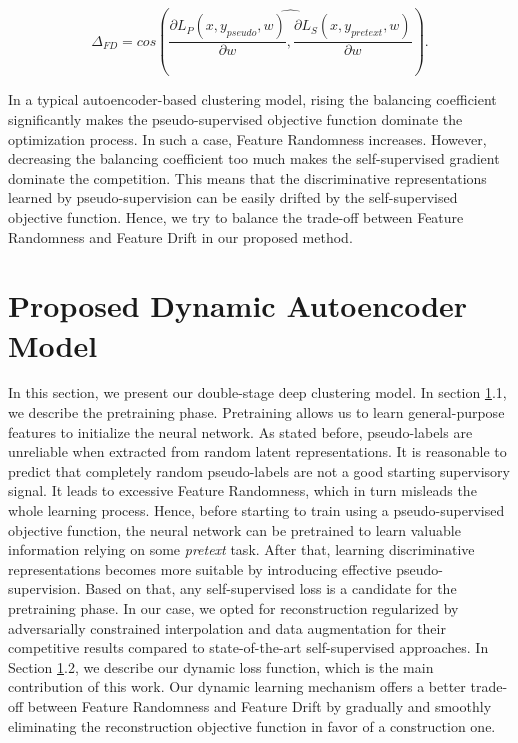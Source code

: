 \documentclass{article}
\begin{document}
\begin{equation} \label{eq:delta_FD}
    \Delta_{FD}= cos(\widehat{\frac{\partial L_{P}(x, y_{pseudo}, w)}{\partial w}, \frac{\partial L_{S}(x, y_{pretext}, w)}{\partial w}}).
\end{equation}









In a typical autoencoder-based clustering model, rising the balancing coefficient significantly makes the pseudo-supervised objective function dominate the optimization process. In such a case, Feature Randomness increases. However, decreasing the balancing coefficient too much makes the self-supervised gradient dominate the competition. This means that the discriminative representations learned by pseudo-supervision can be easily drifted by the self-supervised objective function. Hence, we try to balance the trade-off between Feature Randomness and Feature Drift in our proposed method.

\section{Proposed Dynamic Autoencoder Model}
\label{Sec:methodoloy}
In this section, we present our double-stage deep clustering model. In section \ref{Sec:methodoloy}.1, we describe the pretraining phase. Pretraining allows us to learn general-purpose features to initialize the neural network. As stated before, pseudo-labels are unreliable when extracted from random latent representations. It is reasonable to predict that completely random pseudo-labels are not a good starting supervisory signal. It leads to excessive Feature Randomness, which in turn misleads the whole learning process. Hence, before starting to train using a pseudo-supervised objective function, the neural network can be pretrained to learn valuable information relying on some \textit{pretext} task. After that, learning discriminative representations becomes more suitable by introducing effective pseudo-supervision. Based on that, any self-supervised loss is a candidate for the pretraining phase. In our case, we opted for reconstruction regularized by adversarially constrained interpolation and data augmentation for their competitive results compared to state-of-the-art self-supervised approaches. In Section \ref{Sec:methodoloy}.2, we describe our dynamic loss function, which is the main contribution of this work. Our dynamic learning mechanism offers a better trade-off between Feature Randomness and Feature Drift by gradually and smoothly eliminating the reconstruction objective function in favor of a construction one. 
\end{document}
